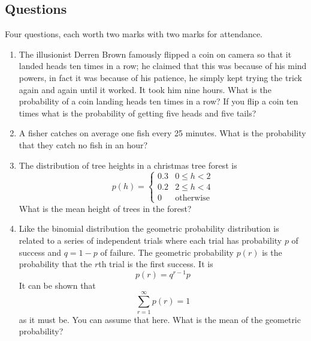 \documentclass[11pt,a4paper]{scrartcl}
\begin{document}
\subsection*{Questions}

Four questions, each worth two marks with two marks for attendance.

\begin{enumerate}

\item The illusionist Derren Brown famously flipped a coin on camera
  so that it landed heads ten times in a row; he claimed that this was
  because of his mind powers, in fact it was because of his patience,
  he simply kept trying the trick again and again until it
  worked. It took him nine hours. What is the probability of a coin landing heads ten times in
  a row? If you flip a coin ten times what is the probability of
  getting five heads and five tails?

\item A fisher catches on average one fish every 25 minutes. What is
  the probability that they catch no fish in an hour?

\item The distribution of tree heights in a christmas tree forest is 
\begin{equation}
p(h)=\left\{\begin{array}{cc}0.3& 0\le h <2\\0.2& 2\le h<4\\0&\mbox{otherwise}\end{array}\right.
\end{equation}
What is the mean height of trees in the forest?

\item Like the binomial distribution the geometric probability
  distribution is related to a series of independent trials where each
  trial has probability $p$ of success and $q=1-p$ of failure. The
  geometric probability $p(r)$ is the probability that the $r$th trial
  is the first success. It is
\begin{equation}
p(r)=q^{r-1}p
\end{equation}
It can be shown that 
\begin{equation}
\sum_{r=1}^\infty p(r)=1
\end{equation}
as it must be. You can assume that here. What is the mean of the geometric probability?

\end{enumerate}
\end{document}

